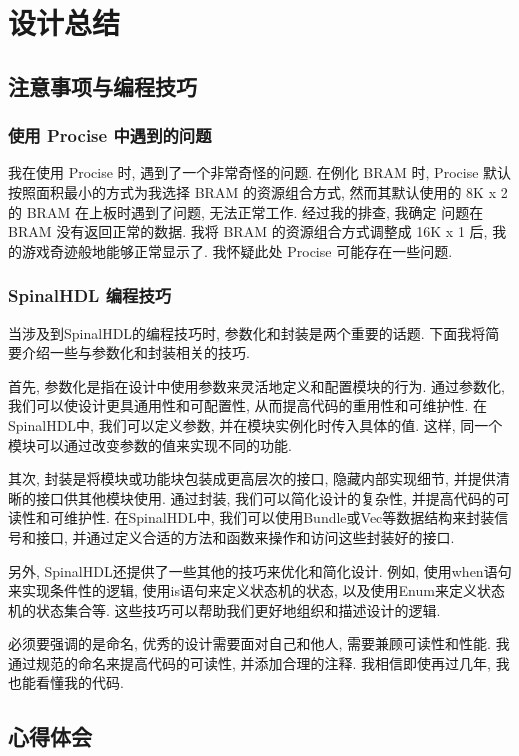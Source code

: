 \section{设计总结}

\subsection{注意事项与编程技巧}

\subsubsection{使用 Procise 中遇到的问题}

我在使用 Procise 时, 遇到了一个非常奇怪的问题. 在例化 BRAM 时, 
Procise 默认按照面积最小的方式为我选择 BRAM 的资源组合方式, 然而其默认使用的
8K x 2 的 BRAM 在上板时遇到了问题, 无法正常工作. 经过我的排查, 我确定
问题在 BRAM 没有返回正常的数据. 我将 BRAM 的资源组合方式调整成 16K x 1 后, 
我的游戏奇迹般地能够正常显示了. 我怀疑此处 Procise 可能存在一些问题. 

\subsubsection{SpinalHDL 编程技巧}


当涉及到SpinalHDL的编程技巧时, 参数化和封装是两个重要的话题. 下面我将简要介绍一些与参数化和封装相关的技巧. 

首先, 参数化是指在设计中使用参数来灵活地定义和配置模块的行为. 通过参数化, 我们可以使设计更具通用性和可配置性, 从而提高代码的重用性和可维护性. 在SpinalHDL中, 我们可以定义参数, 并在模块实例化时传入具体的值. 这样, 同一个模块可以通过改变参数的值来实现不同的功能. 

其次, 封装是将模块或功能块包装成更高层次的接口, 隐藏内部实现细节, 并提供清晰的接口供其他模块使用. 通过封装, 我们可以简化设计的复杂性, 并提高代码的可读性和可维护性. 在SpinalHDL中, 我们可以使用Bundle或Vec等数据结构来封装信号和接口, 并通过定义合适的方法和函数来操作和访问这些封装好的接口. 

另外, SpinalHDL还提供了一些其他的技巧来优化和简化设计. 例如, 使用when语句来实现条件性的逻辑, 使用is语句来定义状态机的状态, 以及使用Enum来定义状态机的状态集合等. 这些技巧可以帮助我们更好地组织和描述设计的逻辑. 

必须要强调的是命名, 优秀的设计需要面对自己和他人, 需要兼顾可读性和性能. 我通过规范的命名来提高代码的可读性, 并添加合理的注释. 我相信即使再过几年, 我也能看懂我的代码. 

\subsection{心得体会}

